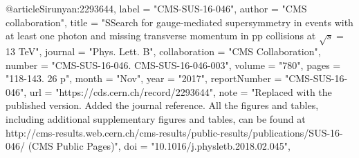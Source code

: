 @article{Sirunyan:2293644,
      label          = "CMS-SUS-16-046",
      author        = "{CMS collaboration}",
      title         = "{SSearch for gauge-mediated supersymmetry in events with
                       at least one photon and missing transverse momentum in pp
                       collisions at $\sqrt{s} = $ 13 TeV}",
      journal       = "Phys. Lett. B",
      collaboration = "CMS Collaboration",
      number        = "CMS-SUS-16-046. CMS-SUS-16-046-003",
      volume        = "780",
      pages         = "118-143. 26 p",
      month         = "Nov",
      year          = "2017",
      reportNumber  = "CMS-SUS-16-046",
      url           = "https://cds.cern.ch/record/2293644",
      note          = "Replaced with the published version. Added the journal
                       reference. All the figures and tables, including additional
                       supplementary figures and tables, can be found at
                       http://cms-results.web.cern.ch/cms-results/public-results/publications/SUS-16-046/
                       (CMS Public Pages)",
      doi           = "10.1016/j.physletb.2018.02.045",
}

